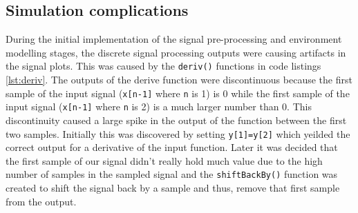 \subsection{Simulation complications}
During the initial implementation of the signal pre-processing and environment modelling stages, the discrete signal processing outputs were causing artifacts in the signal plots. This was caused by the \texttt{deriv()} functions in code listings \ref{lst:deriv}. The outputs of the derive function were discontinuous because the first sample of the input signal (\texttt{x[n-1]} where \texttt{n} is 1) is 0 while the first sample of the input signal (\texttt{x[n-1]} where \texttt{n} is 2) is a much larger number than 0. This discontinuity caused a large spike in the output of the function between the first two samples. Initially this was discovered by setting \texttt{y[1]=y[2]} which yeilded the correct output for a derivative of the input function. Later it was decided that the first sample of our signal didn't really hold much value due to the high number of samples in the sampled signal and the \texttt{shiftBackBy()} function was created to shift the signal back by a sample and thus, remove that first sample from the output.